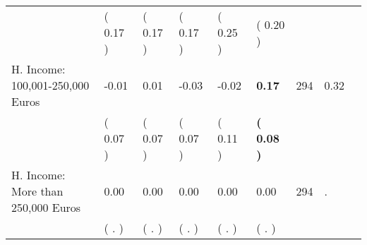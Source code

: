 \begin{tabular}{L{6.2cm} C{1.8cm} C{1.8cm} C{1.8cm} C{1.8cm} C{1.8cm} C{1.8cm} C{0.3cm} C{0.3cm}}
 & (     0.17 ) & (     0.17 ) & (     0.17 ) & (     0.25 ) & (     0.20 )  & \\
H. Income: 100,001-250,000 Euros &     -0.01 &      0.01 &     -0.03 &     -0.02 & \textbf{     0.17}  & 294 &       0.32 \\ 
 & (     0.07 ) & (     0.07 ) & (     0.07 ) & (     0.11 ) & \textbf{(     0.08 )}  & \\
H. Income: More than 250,000 Euros &      0.00 &      0.00 &      0.00 &      0.00 &      0.00  & 294 &          . \\ 
 & (        . ) & (        . ) & (        . ) & (        . ) & (        . )  & \\
\bottomrule
\end{tabular}

